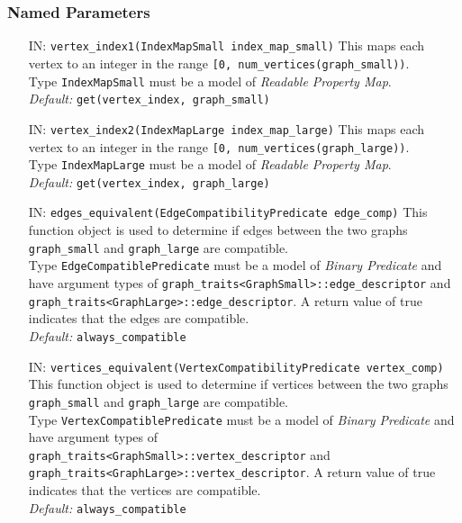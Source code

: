 \documentclass[12pt]{article}
\begin{document}
\subsubsection*{Named Parameters}
               
\begin{itemize}

\item[IN:] \verb+vertex_index1(IndexMapSmall index_map_small)+
This maps each vertex to an integer in the range \verb+[0, num_vertices(graph_small))+.
\\Type \verb+IndexMapSmall+ must be a model of {\em Readable Property Map}. 
\\
{\em Default:} \verb+get(vertex_index, graph_small)+

\item[IN:] \verb+vertex_index2(IndexMapLarge index_map_large)+ 
This maps each vertex to an integer in the range \verb+[0, num_vertices(graph_large))+.
\\Type \verb+IndexMapLarge+ must be a model of {\em Readable Property Map}. 
\\
{\em Default:} \verb+get(vertex_index, graph_large)+

\item[IN:] \verb+edges_equivalent(EdgeCompatibilityPredicate edge_comp)+
This function object is used to determine if edges between the two graphs 
\verb+graph_small+ and \verb+graph_large+ are compatible.\\ 
Type \verb+EdgeCompatiblePredicate+ must be a model of {\em Binary
Predicate} and have argument types of  
\verb+graph_traits<GraphSmall>::edge_descriptor+ and
\verb+graph_traits<GraphLarge>::edge_descriptor+. A return value of true
indicates that the edges are compatible.\\
{\em Default:} \verb+always_compatible+

\item[IN:] \verb+vertices_equivalent(VertexCompatibilityPredicate vertex_comp)+
This function object is used to determine if vertices between the two graphs 
\verb+graph_small+ and \verb+graph_large+ are compatible.\\ 
Type \verb+VertexCompatiblePredicate+ must be a model of {\em Binary
Predicate} and have argument types of\\
\verb+graph_traits<GraphSmall>::vertex_descriptor+ and\\
\verb+graph_traits<GraphLarge>::vertex_descriptor+. A return value of true
indicates that the vertices are compatible. 
\\
{\em Default:} \verb+always_compatible+

\end{itemize}
\end{document}
